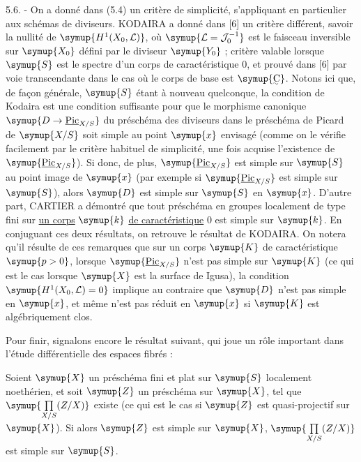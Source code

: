 5.6. - On a donné dans (5.4) un critère de simplicité, s'appliquant en particulier aux
schémas de diviseurs. KODAIRA a donné dans [6] un critère différent, savoir la
nullité de $\symup{H^1(X_0,\mathcal L)}$, où $\symup{\mathcal L=\mathcal J_0^{-1}}$ est le
faisceau inversible sur $\symup{X_0}$ défini par le diviseur $\symup{Y_0}$ ; critère valable
lorsque $\symup{S}$ est le spectre d'un corps de caractéristique 0, et prouvé dans [6]
par voie transcendante dans le cas où le corps de base est $\symup{\text{\uwave{C}}}$. Notons
ici que, de façon générale, $\symup{S}$ étant à nouveau quelconque, la condition de
Kodaira est une condition suffisante pour que le morphisme canonique $\symup{D\to\underline{\operatorname{Pic}}_{X/S}}$ du préschéma des diviseurs dans le préschéma de Picard de $\symup{X/S}$ soit simple au
point $\symup{x}$ envisagé (comme on le vérifie facilement par le critère habituel de
simplicité, une fois acquise l'existence de $\symup{\underline{\operatorname{Pic}}_{X/S}}$). Si
donc, de plus, $\symup{\underline{\operatorname{Pic}}_{X/S}}$ est simple sur $\symup{S}$ au point image de
$\symup{x}$ (par exemple si $\symup{\underline{\operatorname{Pic}}_{X/S}}$ est simple sur $\symup{S}$), alors $\symup{D}$
est simple sur $\symup{S}$ en $\symup{x}$. D'autre part, CARTIER a démontré que tout préschéma
en groupes localement de type fini sur \uline{un corps} $\symup{k}$ \uline{de caractéristique} 0 est
simple sur $\symup{k}$. En conjuguant ces deux résultats, on retrouve le résultat de
KODAIRA. On notera qu'il résulte de ces remarques que sur un corps $\symup{K}$ de
caractéristique $\symup{p>0}$, lorsque $\symup{\underline{\operatorname{Pic}}_{X/S}}$ n'est pas simple sur
$\symup{K}$ (ce qui est le cas lorsque $\symup{X}$ est la surface de Igusa), la condition
$\symup{H^1(X_0,\mathcal L)=0}$ implique au contraire que $\symup{D}$ n'est pas simple en $\symup{x}$,
et même n'est pas réduit en $\symup{x}$ si $\symup{K}$ est algébriquement clos.

Pour finir, signalons encore le résultat suivant, qui joue un rôle important
dans l'étude différentielle des espaces fibrés :

 Soient $\symup{X}$ un préschéma fini et plat sur $\symup{S}$
localement noethérien, et soit $\symup{Z}$ un préschéma sur $\symup{X}$, tel que
$\symup{\prod\limits_{X/S}(Z/X)}$ existe (ce qui est le cas si $\symup{Z}$ est quasi-projectif sur $\symup{X}$).
Si alors $\symup{Z}$ est simple sur $\symup{X}$, $\symup{\prod\limits_{X/S}(Z/X)}$ est simple sur $\symup{S}$.

